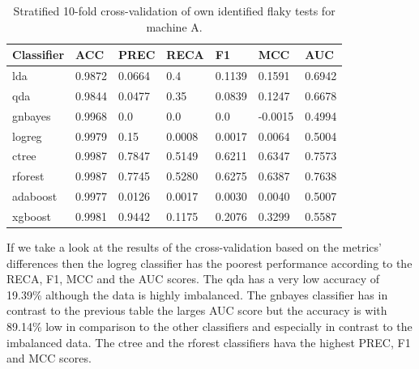 \documentclass{seal_thesis}
\begin{document}
\begin{table}[ht]
\centering
\begin{tabular}{|l|l|l|l|l|l|l|}
\hline
\textbf{Classifier} & \textbf{ACC} & \textbf{PREC} & \textbf{RECA} & \textbf{F1} & \textbf{MCC} & \textbf{AUC} \\ \hline
  lda & 0.9872 & 0.0664 & 0.4 & 0.1139 & 0.1591 & 0.6942 \\ \hline
  qda & 0.9844 & 0.0477 & 0.35 & 0.0839 & 0.1247 & 0.6678 \\ \hline
  gnbayes & 0.9968 & 0.0 & 0.0 & 0.0 & -0.0015 & 0.4994 \\ \hline
  logreg & 0.9979 & 0.15 & 0.0008 & 0.0017 & 0.0064 & 0.5004 \\ \hline
  ctree & 0.9987 & 0.7847 & 0.5149 & 0.6211 & 0.6347 & 0.7573 \\ \hline
  rforest & 0.9987 & 0.7745 & 0.5280 & 0.6275 & 0.6387 & 0.7638 \\ \hline
  adaboost & 0.9977 & 0.0126 & 0.0017 & 0.0030 & 0.0040 & 0.5007 \\ \hline
  xgboost & 0.9981 & 0.9442 & 0.1175 & 0.2076 & 0.3299 & 0.5587 \\ \hline
\end{tabular}
\caption{Stratified 10-fold cross-validation of own identified flaky tests for machine A.}
\label{tab:cvmachineAown}
\end{table}

\noindent If we take a look at the results of the cross-validation based on the metrics' differences then the logreg classifier has the poorest performance according to the RECA, F1, MCC and the AUC scores. The qda has a very low accuracy of 19.39\% although the data is highly imbalanced. The gnbayes classifier has in contrast to the previous table the larges AUC score but the accuracy is with 89.14\% low in comparison to the other classifiers and especially in contrast to the imbalanced data. The ctree and the rforest classifiers hava the highest PREC, F1 and MCC scores. \\
\end{document}
